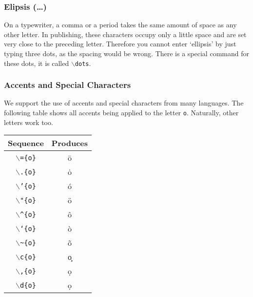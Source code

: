 \documentclass[11pt]{article}
\newcommand{\cmd}[1]{{\tt $\backslash$#1}}
\begin{document}

\subsubsection{Elipsis (\ldots)}

On a typewriter, a comma or a period takes the same amount of space as
any other letter. In publishing, these characters occupy only a little
space and are set very close to the preceding letter. Therefore you
cannot enter `ellipsis' by just typing three dots, as the spacing
would be wrong. There is a special command for these dots, it is
called \cmd{dots}.

\subsubsection{Accents and Special Characters}

We support the use of accents and special characters from many
languages. The following table shows all accents being applied to the
letter {\tt o}. Naturally, other letters work too.


\vspace{0.4cm}
\begin{tabular}{c|c}
  Sequence & Produces\\
\hline
  \cmd{=\{o\}} & \=o \\
  \cmd{.\{o\}} & \.o \\
  \cmd{'\{o\}} & \'o \\
  \cmd{"\{o\}} & \"o \\
  \cmd{\textasciicircum \{o\}} & \^o \\
  \cmd{`\{o\}} & \`o \\
  \cmd{\textasciitilde \{o\}} & \~o \\
  \cmd{c\{o\}} & \c{o}\\
  \cmd{,\{o\}} & \d{o}\\
  \cmd{d\{o\}} & \d{o}\\
\end{tabular}
\vspace{0.4cm}
\end{document}
